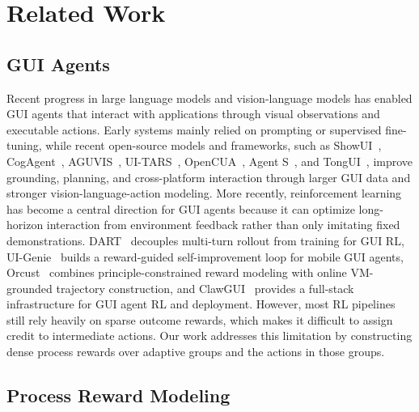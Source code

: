 \section{Related Work}
\label{sec:related}

\subsection{GUI Agents}

Recent progress in large language models and vision-language models has enabled GUI agents that interact with applications through visual observations and executable actions. Early systems mainly relied on prompting or supervised fine-tuning, while recent open-source models and frameworks, such as ShowUI~\cite{lin2024showui}, CogAgent~\cite{hong2024cogagent}, AGUVIS~\cite{xu2024aguvis}, UI-TARS~\cite{qin2025ui}, OpenCUA~\cite{wang2025opencuaopenfoundationscomputeruse}, Agent S~\cite{agashe2024agent}, and TongUI~\cite{zhang2025tongui}, improve grounding, planning, and cross-platform interaction through larger GUI data and stronger vision-language-action modeling. More recently, reinforcement learning has become a central direction for GUI agents because it can optimize long-horizon interaction from environment feedback rather than only imitating fixed demonstrations. DART~\cite{li2025dart} decouples multi-turn rollout from training for GUI RL, UI-Genie~\cite{xiao2025uigenie} builds a reward-guided self-improvement loop for mobile GUI agents, Orcust~\cite{lu2025orcust} combines principle-constrained reward modeling with online VM-grounded trajectory construction, and ClawGUI~\cite{tang2026clawgui} provides a full-stack infrastructure for GUI agent RL and deployment. However, most RL pipelines still rely heavily on sparse outcome rewards, which makes it difficult to assign credit to intermediate actions. Our work addresses this limitation by constructing dense process rewards over adaptive groups and the actions in those groups.

\subsection{Process Reward Modeling}


